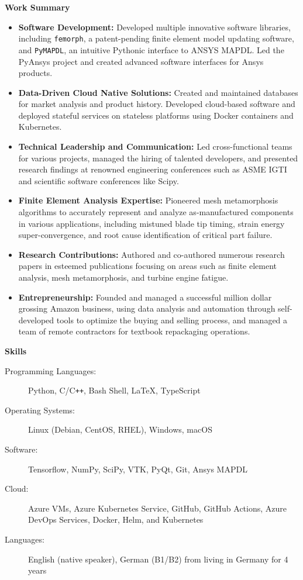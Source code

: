 \documentclass[letterpaper,11pt]{article}
\newcommand{\resheading}[1]{{\large \colorbox{mygrey}{\begin{minipage}{\textwidth}{\textbf{#1 \vphantom{p\^{E}}}}\end{minipage}}}}
\begin{document}
\resheading{Work Summary}
\begin{itemize}
  \item \textbf{Software Development:} Developed multiple innovative software libraries, including \texttt{femorph}, a patent-pending finite element model updating software, and \texttt{PyMAPDL}, an intuitive Pythonic interface to ANSYS MAPDL. Led the PyAnsys project and created advanced software interfaces for Ansys products.
  \item \textbf{Data-Driven Cloud Native Solutions:} Created and maintained databases for market analysis and product history. Developed cloud-based software and deployed stateful services on stateless platforms using Docker containers and Kubernetes.
  \item \textbf{Technical Leadership and Communication:} Led cross-functional teams for various projects, managed the hiring of talented developers, and presented research findings at renowned engineering conferences such as ASME IGTI and scientific software conferences like Scipy.
  \item \textbf{Finite Element Analysis Expertise:} Pioneered mesh metamorphosis algorithms to accurately represent and analyze as-manufactured components in various applications, including mistuned blade tip timing, strain energy super-convergence, and root cause identification of critical part failure.
  \item \textbf{Research Contributions:} Authored and co-authored numerous research papers in esteemed publications focusing on areas such as finite element analysis, mesh metamorphosis, and turbine engine fatigue.
  \item \textbf{Entrepreneurship:} Founded and managed a successful million dollar grossing Amazon business, using data analysis and automation through self-developed tools to optimize the buying and selling process, and managed a team of remote contractors for textbook repackaging operations.
\end{itemize}

\resheading{Skills}

\begin{description}
\item[Programming Languages:] Python, C/C{}\verb!++!, Bash Shell, \LaTeX, TypeScript
\item[Operating Systems:] Linux (Debian, CentOS, RHEL), Windows, macOS
\item[Software:] Tensorflow, NumPy, SciPy, VTK, PyQt, Git, Ansys MAPDL
\item[Cloud:] Azure VMs, Azure Kubernetes Service, GitHub, GitHub Actions, Azure DevOps Services, Docker, Helm, and Kubernetes
\item [Languages:] English (native speaker), German (B1/B2) from living in Germany for 4 years
\end{description}
\end{document}

